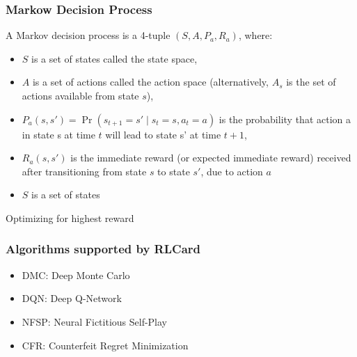 \begin{frame}
    \frametitle{Markow Decision Process}
    A Markov decision process is a 4-tuple $(S,A,P_{a},R_{a})$, where:

    \begin{itemize}
        \item $S$ is a set of states called the state space,
        \item $A$ is a set of actions called the action space (alternatively, $A_s$ is the set of actions available from state $s$),
        \item $P_{a}(s,s')=\Pr(s_{t+1}=s'\mid s_{t}=s,a_{t}=a)$ is the probability that action a in state s at time $t$ will lead to state s' at time $t+1$,
        \item $R_{a}(s,s')$ is the immediate reward (or expected immediate reward) received after transitioning from state $s$ to state $s'$, due to action $a$
        \item $S$ is a set of states
    \end{itemize}

    Optimizing for highest reward

\end{frame}

\begin{frame}
    \frametitle{Algorithms supported by RLCard}

    \begin{itemize}
        \item DMC: Deep Monte Carlo %
        \item DQN: Deep Q-Network %
        \item NFSP: Neural Fictitious Self-Play
        \item CFR: Counterfeit Regret Minimization
    \end{itemize}
\end{frame}
